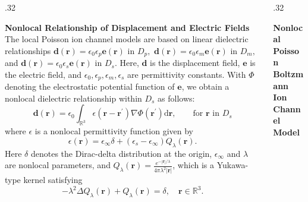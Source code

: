 \documentclass[10pt]{beamer}
\newcommand{\rr}{{\mathbf r}}
\newcommand{\rp}{{\mathbf r}^{\prime}}
\newcommand{\ee}{{\mathbf e}}
\newcommand{\dd}{{\mathbf d}}
\newcommand{\ei}{\epsilon_\infty}
\newcommand{\es}{\epsilon_s}
\newcommand{\ep}{\epsilon_p}
\newcommand{\emem}{\epsilon_m}
\newcommand{\ez}{\epsilon_0}
\begin{document}
\begin{frame}{}
\begin{columns}[t]
\begin{column}{.32\linewidth}
\begin{block}{\centering \bf \large Nonlocal Relationship of Displacement and Electric Fields}
                The local Poisson ion channel models are based on linear dielectric relationships $\dd(\rr) = \ez \ep \ee(\rr)$ in $D_p,$ $\dd(\rr) = \ez \emem \ee(\rr)$ in $D_m,$ and $\dd(\rr) =\ez \es \ee(\rr)$ in $D_s.$ Here, $\dd$ is the displacement field, $\ee$ is the electric field, and $\ez, \ep, \emem, \es$ are permittivity constants. With $\Phi$ denoting the electrostatic potential function of $\ee$, we obtain a nonlocal dielectric relationship within $D_s$ as follows:
                \begin{equation*}
                    \dd(\rr) = \ez \int_{\mathbb{R}^3} \epsilon(\rr- \rp) \nabla \Phi(\rp)\mathrm{d}\rr, \qquad\text{for $\rr$ in $D_s$}  
                \end{equation*}
                 where $\epsilon$ is a nonlocal permittivity function given by 
                 \begin{equation*}
                      \epsilon(\rr) = \ei \delta + (\es - \ei)Q_\lambda(\rr).
                 \end{equation*}
                Here $\delta$ denotes the Dirac-delta distribution at the origin, $\ei$ and $\lambda$ are nonlocal parameters, and $Q_{\lambda}(\rr)=\frac{e^{-|\rr|/\lambda}}{4\pi \lambda^2 |\rr|}$, which is a Yukawa-type kernel satisfying
                \[ -\lambda^2\Delta Q_{\lambda}(\rr) + Q_{\lambda}(\rr) =\delta, \quad  \rr \in \mathbb{R}^{3}.\]
                \end{block}

            \end{column}
            \begin{column}{.32\linewidth}
                \begin{block}{\centering \bf \large Nonlocal Poisson Boltzmann Ion Channel Model}
                

\end{block}
\end{column}
\end{columns}
\end{frame}
\end{document}
